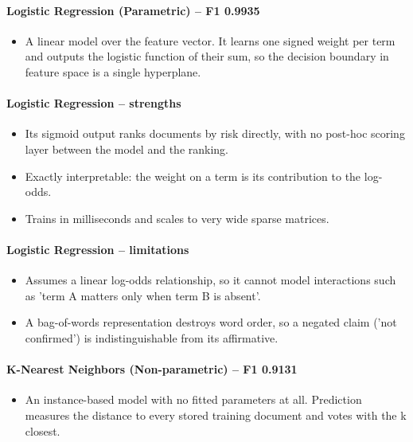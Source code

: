 \documentclass[conference,a4paper]{IEEEtran}
\begin{document}
\paragraph{Logistic Regression (Parametric) -- F1 0.9935}

\begin{itemize}
  \item A linear model over the feature vector. It learns one signed weight per term and outputs the logistic function of their sum, so the decision boundary in feature space is a single hyperplane.
\end{itemize}

\paragraph{Logistic Regression -- strengths}

\begin{itemize}
  \item Its sigmoid output ranks documents by risk directly, with no post-hoc scoring layer between the model and the ranking.
  \item Exactly interpretable: the weight on a term is its contribution to the log-odds.
  \item Trains in milliseconds and scales to very wide sparse matrices.
\end{itemize}

\paragraph{Logistic Regression -- limitations}

\begin{itemize}
  \item Assumes a linear log-odds relationship, so it cannot model interactions such as 'term A matters only when term B is absent'.
  \item A bag-of-words representation destroys word order, so a negated claim ('not confirmed') is indistinguishable from its affirmative.
\end{itemize}

\paragraph{K-Nearest Neighbors (Non-parametric) -- F1 0.9131}

\begin{itemize}
  \item An instance-based model with no fitted parameters at all. Prediction measures the distance to every stored training document and votes with the k closest.
\end{itemize}
\end{document}
